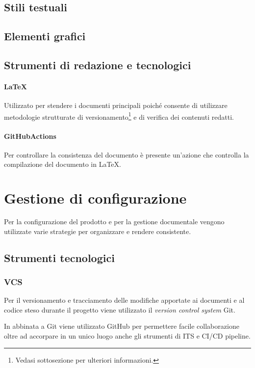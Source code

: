 \subsection{Stili testuali}
\subsection{Elementi grafici}
\subsection{Strumenti di redazione e tecnologici}

\paragraph{LaTeX} Utilizzato per stendere i documenti principali poiché consente di utilizzare metodologie strutturate di versionamento\footnote{Vedasi sottosezione  per ulteriori informazioni.} e di verifica dei contenuti redatti.

\paragraph{GitHubActions} Per controllare la consistenza del documento è presente un'azione che controlla la compilazione del documento in LaTeX.

\section{Gestione di configurazione}

Per la configurazione del prodotto e per la gestione documentale vengono utilizzate varie strategie per organizzare e rendere consistente.

\subsection{Strumenti tecnologici}

\subsubsection{VCS}\label{sss:vcs} Per il versionamento e tracciamento delle modifiche apportate ai documenti e al codice steso durante il progetto viene utilizzato il \textit{version control system} Git. 

In abbinata a Git viene utilizzato GitHub per permettere facile collaborazione oltre ad accorpare in un unico luogo anche gli strumenti di ITS e CI/CD pipeline.

